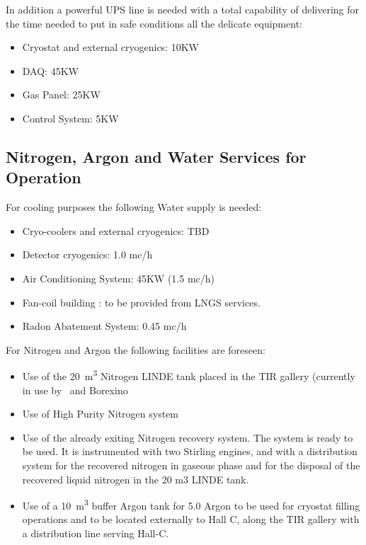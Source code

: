 In addition a powerful UPS line is needed with a total capability of delivering \TotalUPSPowerConsumption for 
the time needed to put in safe conditions all the delicate equipment: 
\begin{itemize}
\item Cryostat and external cryogenics: 10KW
\item DAQ: 45KW 
\item Gas Panel: 25KW 
\item Control System: 5KW 
\end{itemize}

\subsection{Nitrogen, Argon and Water Services for \DSks Operation}
\label{sec:NitrogenArgonAndWater}

For cooling purposes the following Water supply is needed:
\begin{itemize} 
\item Cryo-coolers and external cryogenics: TBD 
\item Detector cryogenics: 1.0 mc/h 
\item Air Conditioning System: 45KW (1.5 mc/h)
\item Fan-coil building : to be provided from LNGS services.
\item Radon Abatement System: 0.45 mc/h 
\end{itemize} 

\vspace{\baselineskip}

For Nitrogen and Argon the following facilities are foreseen:
\begin{itemize}
\item Use of the \SI{20}{\cubic\meter} Nitrogen LINDE tank placed in the TIR gallery (currently in use by \DSf\ and Borexino 
\item Use of High Purity Nitrogen system
\item Use of the already exiting Nitrogen recovery system. The system is  ready to be used. It is instrumented with two Stirling engines, and with a distribution system for the recovered nitrogen in gaseous phase and for the disposal of the recovered liquid nitrogen in the 20 m3 LINDE tank.
\item Use of a \SI{10}{\cubic\meter} buffer Argon tank for 5.0 Argon to be used for cryostat filling operations and to be located externally to Hall C, along the TIR gallery with a distribution line serving Hall-C.
\end{itemize}

